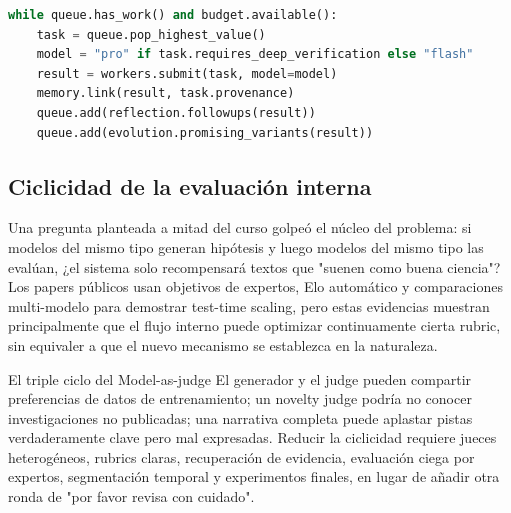 \begin{lstlisting}[language=Python,caption={Esquema de enrutamiento de recursos del Supervisor asíncrono}]
while queue.has_work() and budget.available():
    task = queue.pop_highest_value()
    model = "pro" if task.requires_deep_verification else "flash"
    result = workers.submit(task, model=model)
    memory.link(result, task.provenance)
    queue.add(reflection.followups(result))
    queue.add(evolution.promising_variants(result))
\end{lstlisting}


\subsection{Ciclicidad de la evaluación interna}

Una pregunta planteada a mitad del curso golpeó el núcleo del problema: si modelos del mismo tipo generan hipótesis y luego modelos del mismo tipo las evalúan, ¿el sistema solo recompensará textos que "suenen como buena ciencia"? Los papers públicos usan objetivos de expertos, Elo automático y comparaciones multi-modelo para demostrar test-time scaling, pero estas evidencias muestran principalmente que el flujo interno puede optimizar continuamente cierta rubric, sin equivaler a que el nuevo mecanismo se establezca en la naturaleza.

\begin{warningbox}{El triple ciclo del Model-as-judge}
El generador y el judge pueden compartir preferencias de datos de entrenamiento; un novelty judge podría no conocer investigaciones no publicadas; una narrativa completa puede aplastar pistas verdaderamente clave pero mal expresadas. Reducir la ciclicidad requiere jueces heterogéneos, rubrics claras, recuperación de evidencia, evaluación ciega por expertos, segmentación temporal y experimentos finales, en lugar de añadir otra ronda de "por favor revisa con cuidado".
\end{warningbox}


